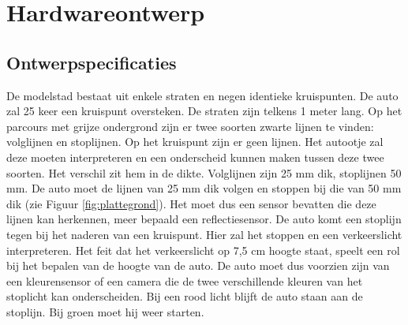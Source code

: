 \documentclass[a4paper,twoside,kulak]{kulakreport} %
\begin{document}
\section{Hardwareontwerp} \label{Hardwareontwerp}

\subsection{Ontwerpspecificaties} \label{Ontwerpspecificaties}


De modelstad bestaat uit enkele straten en negen identieke kruispunten. De auto zal 25 keer een kruispunt oversteken. De straten zijn telkens 1 meter lang. Op het parcours met grijze ondergrond zijn er twee soorten zwarte lijnen te vinden: volglijnen en stoplijnen. Op het kruispunt zijn er geen lijnen. Het autootje zal deze moeten interpreteren en een onderscheid kunnen maken tussen deze twee soorten. Het verschil zit hem in de dikte. Volglijnen zijn 25 mm dik, stoplijnen 50 mm. De auto moet de lijnen van 25 mm dik volgen en stoppen bij die van 50 mm dik (zie Figuur \ref{fig:plattegrond}). Het moet dus een sensor bevatten die deze lijnen kan herkennen, meer bepaald een reflectiesensor. De auto komt een stoplijn tegen bij het naderen van een kruispunt. Hier zal het stoppen en een verkeerslicht interpreteren. Het feit dat het verkeerslicht op 7,5 cm hoogte staat, speelt een rol bij het bepalen van de hoogte van de auto. De auto moet dus voorzien zijn van een kleurensensor of een camera die de twee verschillende kleuren van het stoplicht kan onderscheiden. Bij een rood licht blijft de auto staan aan de stoplijn. Bij groen moet hij weer starten. 
\end{document}
